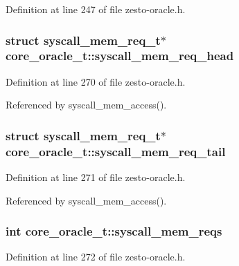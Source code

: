 Definition at line 247 of file zesto-oracle.h.
\subsubsection[{syscall\_\-mem\_\-req\_\-head}]{\setlength{\rightskip}{0pt plus 5cm}struct {\bf syscall\_\-mem\_\-req\_\-t}$\ast$ {\bf core\_\-oracle\_\-t::syscall\_\-mem\_\-req\_\-head}\hspace{0.3cm}{\tt  [read, protected]}}\label{classcore__oracle__t_ff4556f23f40969aeb29752f6320806c}




Definition at line 270 of file zesto-oracle.h.

Referenced by syscall\_\-mem\_\-access().
\subsubsection[{syscall\_\-mem\_\-req\_\-tail}]{\setlength{\rightskip}{0pt plus 5cm}struct {\bf syscall\_\-mem\_\-req\_\-t}$\ast$ {\bf core\_\-oracle\_\-t::syscall\_\-mem\_\-req\_\-tail}\hspace{0.3cm}{\tt  [read, protected]}}\label{classcore__oracle__t_e0056b27f0e80b013e332555b9779ea0}




Definition at line 271 of file zesto-oracle.h.

Referenced by syscall\_\-mem\_\-access().
\subsubsection[{syscall\_\-mem\_\-reqs}]{\setlength{\rightskip}{0pt plus 5cm}int {\bf core\_\-oracle\_\-t::syscall\_\-mem\_\-reqs}\hspace{0.3cm}{\tt  [protected]}}\label{classcore__oracle__t_fb70d110090a9c1d7d257ef63d95dd51}




Definition at line 272 of file zesto-oracle.h.

